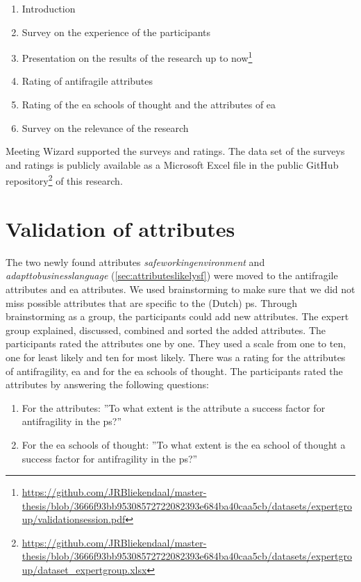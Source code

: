 \begin{enumerate}
	\item{Introduction}
	\item{Survey on the experience of the participants}
	\item{Presentation on the results of the research up to now\footnote{\url{https://github.com/JRBliekendaal/master-thesis/blob/3666f93bb95308572722082393e684ba40caa5cb/datasets/expertgroup/validationsession.pdf}}}
	\item{Rating of \gls{antifragile} \glspl{attribute}}
	\item{Rating of the \gls{ea} schools of thought and the \glspl{attribute} of \gls{ea}}
	\item{Survey on the relevance of the research}
\end{enumerate}
Meeting Wizard supported the surveys and ratings. The data set of the surveys and ratings is publicly available as a Microsoft Excel file in the public GitHub repository\footnote{\url{https://github.com/JRBliekendaal/master-thesis/blob/3666f93bb95308572722082393e684ba40caa5cb/datasets/expertgroup/dataset_expertgroup.xlsx}} of this research.
\section{Validation of attributes}
\label{sec:validationofattributes}
The two newly found attributes \textit{\gls{safeworkingenvironment}} and \textit{\gls{adapttobusinesslanguage}} (\cref{sec:attributeslikelysf}) were moved to the \gls{antifragile} \glspl{attribute} and \gls{ea} \glspl{attribute}. We used brainstorming to make sure that we did not miss possible \glspl{attribute} that are specific to the (Dutch) \gls{ps}. Through brainstorming as a group, the participants could add new \glspl{attribute}. The expert group explained, discussed, combined and sorted the added \glspl{attribute}. The participants rated the \glspl{attribute} one by one. They used a scale from one to ten, one for least likely and ten for most likely. There was a rating for the \glspl{attribute} of \gls{antifragility}, \gls{ea} and for the \gls{ea} schools of thought. The participants rated the \glspl{attribute} by answering the following questions:
\begin{enumerate}
	\item{For the \glspl{attribute}: ''To what extent is the \gls{attribute} a success factor for \gls{antifragility} in the \gls{ps}?''}
	\item{For the \gls{ea} schools of thought: ''To what extent is the \gls{ea} school of thought a success factor for \gls{antifragility} in the \gls{ps}?''}
\end{enumerate}
